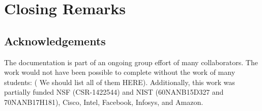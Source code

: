 
\chapter{Closing Remarks}
\section{Acknowledgements}
The documentation is part of an ongoing group effort of many collaborators. The
work would not have been possible to complete without the work of many
students: ( We should list all of them HERE).  Additionally, this work was
partially funded NSF (CSR-1422544) and NIST (60NANB15D327 and 70NANB17H181),
Cisco, Intel, Facebook, Infosys, and Amazon.
